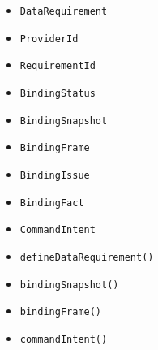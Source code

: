 \begin{itemize}
\tightlist
\item
  \texttt{D\allowbreak{}a\allowbreak{}t\allowbreak{}a\allowbreak{}R\allowbreak{}e\allowbreak{}q\allowbreak{}u\allowbreak{}i\allowbreak{}r\allowbreak{}e\allowbreak{}m\allowbreak{}e\allowbreak{}n\allowbreak{}t}
\item
  \texttt{P\allowbreak{}r\allowbreak{}o\allowbreak{}v\allowbreak{}i\allowbreak{}d\allowbreak{}e\allowbreak{}r\allowbreak{}I\allowbreak{}d}
\item
  \texttt{R\allowbreak{}e\allowbreak{}q\allowbreak{}u\allowbreak{}i\allowbreak{}r\allowbreak{}e\allowbreak{}m\allowbreak{}e\allowbreak{}n\allowbreak{}t\allowbreak{}I\allowbreak{}d}
\item
  \texttt{B\allowbreak{}i\allowbreak{}n\allowbreak{}d\allowbreak{}i\allowbreak{}n\allowbreak{}g\allowbreak{}S\allowbreak{}t\allowbreak{}a\allowbreak{}t\allowbreak{}u\allowbreak{}s}
\item
  \texttt{B\allowbreak{}i\allowbreak{}n\allowbreak{}d\allowbreak{}i\allowbreak{}n\allowbreak{}g\allowbreak{}S\allowbreak{}n\allowbreak{}a\allowbreak{}p\allowbreak{}s\allowbreak{}h\allowbreak{}o\allowbreak{}t}
\item
  \texttt{B\allowbreak{}i\allowbreak{}n\allowbreak{}d\allowbreak{}i\allowbreak{}n\allowbreak{}g\allowbreak{}F\allowbreak{}r\allowbreak{}a\allowbreak{}m\allowbreak{}e}
\item
  \texttt{B\allowbreak{}i\allowbreak{}n\allowbreak{}d\allowbreak{}i\allowbreak{}n\allowbreak{}g\allowbreak{}I\allowbreak{}s\allowbreak{}s\allowbreak{}u\allowbreak{}e}
\item
  \texttt{B\allowbreak{}i\allowbreak{}n\allowbreak{}d\allowbreak{}i\allowbreak{}n\allowbreak{}g\allowbreak{}F\allowbreak{}a\allowbreak{}c\allowbreak{}t}
\item
  \texttt{C\allowbreak{}o\allowbreak{}m\allowbreak{}m\allowbreak{}a\allowbreak{}n\allowbreak{}d\allowbreak{}I\allowbreak{}n\allowbreak{}t\allowbreak{}e\allowbreak{}n\allowbreak{}t}
\item
  \texttt{d\allowbreak{}e\allowbreak{}f\allowbreak{}i\allowbreak{}n\allowbreak{}e\allowbreak{}D\allowbreak{}a\allowbreak{}t\allowbreak{}a\allowbreak{}R\allowbreak{}e\allowbreak{}q\allowbreak{}u\allowbreak{}i\allowbreak{}r\allowbreak{}e\allowbreak{}m\allowbreak{}e\allowbreak{}n\allowbreak{}t\allowbreak{}(\allowbreak{})}
\item
  \texttt{b\allowbreak{}i\allowbreak{}n\allowbreak{}d\allowbreak{}i\allowbreak{}n\allowbreak{}g\allowbreak{}S\allowbreak{}n\allowbreak{}a\allowbreak{}p\allowbreak{}s\allowbreak{}h\allowbreak{}o\allowbreak{}t\allowbreak{}(\allowbreak{})}
\item
  \texttt{b\allowbreak{}i\allowbreak{}n\allowbreak{}d\allowbreak{}i\allowbreak{}n\allowbreak{}g\allowbreak{}F\allowbreak{}r\allowbreak{}a\allowbreak{}m\allowbreak{}e\allowbreak{}(\allowbreak{})}
\item
  \texttt{c\allowbreak{}o\allowbreak{}m\allowbreak{}m\allowbreak{}a\allowbreak{}n\allowbreak{}d\allowbreak{}I\allowbreak{}n\allowbreak{}t\allowbreak{}e\allowbreak{}n\allowbreak{}t\allowbreak{}(\allowbreak{})}
\end{itemize}

